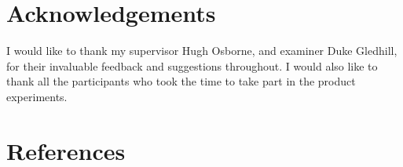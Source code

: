 \documentclass[abstract=on,12pt]{scrreprt}
\begin{document}
	\setcounter{secnumdepth}{-2}

	\chapter{Acknowledgements}
		I would like to thank my supervisor Hugh Osborne, and examiner Duke Gledhill, for their invaluable feedback and suggestions throughout.
		I would also like to thank all the participants who took the time to take part in the product experiments.

	\titleformat{\chapter}[hang]{\huge\bfseries}{\thechapter}{1em}{\huge}

	\newpage
	\renewcommand\thepage{\arabic{page}}
	\setcounter{secnumdepth}{3}

	

	

	

	
	
	

	

	\nocite{*}	%
	\begingroup
		\chapter{References}
		\label{ref}

		\renewcommand{\chapter}[2]{}		%
	\endgroup

			

\end{document}
